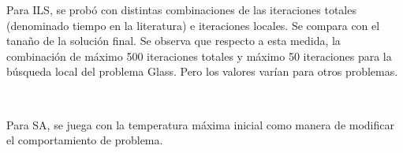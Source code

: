 \documentclass[11pt]{article}
\begin{document}
Para ILS, se probó con distintas combinaciones de las iteraciones totales (denominado tiempo en la literatura) e iteraciones locales. Se compara con el tanaño de la solución final. Se observa que respecto a esta medida, la combinación de máximo 500 iteraciones totales y máximo 50 iteraciones para la búsqueda local del problema Glass. Pero los valores varían para otros problemas.

\begin{table}[h]
\caption{Entonación de parámetros ILS, donde la una tupla representa (\% Error de validación, \% Tamaño al que se reduce)}
\label{tabla:1}
\end{table}

~\

Para SA, se juega con la temperatura máxima inicial como manera de modificar el comportamiento de problema.

~\

\begin{table}[h]
\caption{Entonación de parámetros SA, donde la una tupla representa (\% Error de validación, \% Tamaño al que se reduce)}
\label{tabla:2}
\end{table}
\end{document}

